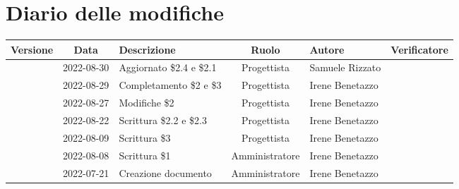 \section*{Diario delle modifiche}
	\begin{center}
	\renewcommand{\arraystretch}{1.8} %
	\begin{longtable}{ |c|c|p{8em}|c|m{5em}|m{6em}| }
	\hline
	\textbf{Versione} & \textbf{Data} & \textbf{Descrizione} &  \textbf{Ruolo} &  \textbf{Autore} & \textbf{Verificatore}\\ %
	\hline %
	& 2022-08-30 & Aggiornato \$2.4 e \$2.1 & Progettista & Samuele \newline Rizzato & \\ 
	\hline
	& 2022-08-29 & Completamento \$2 e \$3 & Progettista & Irene \newline Benetazzo & \\ 
	\hline
	& 2022-08-27 & Modifiche \$2 & Progettista & Irene \newline Benetazzo & \\ 
	\hline
	& 2022-08-22 & Scrittura \$2.2 e \$2.3 & Progettista & Irene \newline Benetazzo & \\ 
	\hline
    & 2022-08-09 & Scrittura \$3 & Progettista & Irene \newline Benetazzo & \\ 
	\hline
	& 2022-08-08 & Scrittura \$1 & Amministratore & Irene \newline Benetazzo & \\ 
	\hline
	& 2022-07-21 & Creazione documento & Amministratore & Irene \newline Benetazzo & \\ 
	\hline
	\end{longtable}
	\end{center}
	\newpage